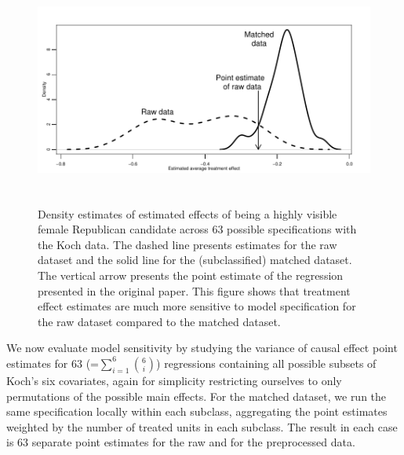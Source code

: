 \documentclass[11pt,titlepage]{article}
\begin{document}
\begin{figure}[t] 
 \begin{center}
   \includegraphics[height=3in,angle=0]{figs/kochdens.pdf}
 \end{center} 
 \vspace{-0.275in}
 \caption{Density estimates of estimated effects of
   being a highly visible female Republican candidate across 63
   possible specifications with the Koch data.  The dashed line
   presents estimates for the raw dataset and the solid line for the
   (subclassified) matched dataset.  The vertical arrow presents the
   point estimate of the regression presented in the original paper.
   This figure shows that treatment effect estimates are much more
   sensitive to model specification for the raw dataset compared to
   the matched dataset.}
 \label{fg:kochdens}
\end{figure}

We now evaluate model sensitivity by studying the variance of causal
effect point estimates for 63 (=$\sum_{i=1}^6 {6 \choose i}$)
regressions containing all possible subsets of Koch's six covariates,
again for simplicity restricting ourselves to only permutations of the
possible main effects.  For the matched dataset, we run the same
specification locally within each subclass, aggregating the point
estimates weighted by the number of treated units in each subclass.
The result in each case is 63 separate point estimates for the raw and
for the preprocessed data.
\end{document}
